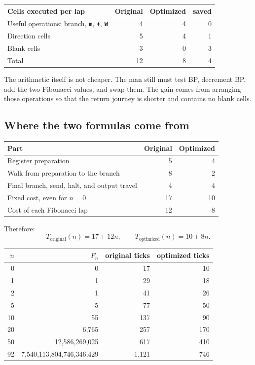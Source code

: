 \documentclass[11pt,a4paper]{article}
\newcommand{\op}[1]{\texttt{\bfseries #1}}
\newcommand{\Fib}[1]{F_{#1}}
\begin{document}
\begin{center}
\begin{tabular}{l|r|r|r}
  \toprule
  \textbf{Cells executed per lap} & \textbf{Original}
    & \textbf{Optimized} & \textbf{saved}\\
  \midrule
  Useful operations: branch, \op{m}, \op{+}, \op{W} & 4 & 4 & 0\\
  Direction cells & 5 & 4 & 1\\
  Blank cells & 3 & 0 & 3\\
  \midrule
  Total & 12 & 8 & 4\\
  \bottomrule
\end{tabular}
\end{center}

The arithmetic itself is not cheaper. The man still must test BP, decrement
BP, add the two Fibonacci values, and swap them. The gain comes from arranging
those operations so that the return journey is shorter and contains no
blank cells.

\subsection{Where the two formulas come from}

\begin{center}
\begin{tabular}{l|r|r}
  \toprule
  \textbf{Part} & \textbf{Original} & \textbf{Optimized}\\
  \midrule
  Register preparation & 5 & 4\\
  Walk from preparation to the branch & 8 & 2\\
  Final branch, send, halt, and output travel & 4 & 4\\
  \midrule
  Fixed cost, even for \(n=0\) & 17 & 10\\
  Cost of each Fibonacci lap & 12 & 8\\
  \bottomrule
\end{tabular}
\end{center}

Therefore:
\[
  T_{\text{original}}(n)=17+12n,
  \qquad
  T_{\text{optimized}}(n)=10+8n.
\]

\begin{center}
\begin{tabular}{r|r|r|r}
  \toprule
  \(n\) & \(\Fib n\) & \textbf{original ticks}
    & \textbf{optimized ticks}\\
  \midrule
  0  & 0 & 17 & 10\\
  1  & 1 & 29 & 18\\
  2  & 1 & 41 & 26\\
  5  & 5 & 77 & 50\\
  10 & 55 & 137 & 90\\
  20 & 6,765 & 257 & 170\\
  50 & 12,586,269,025 & 617 & 410\\
  92 & 7,540,113,804,746,346,429 & 1,121 & 746\\
  \bottomrule
\end{tabular}
\end{center}
\end{document}
